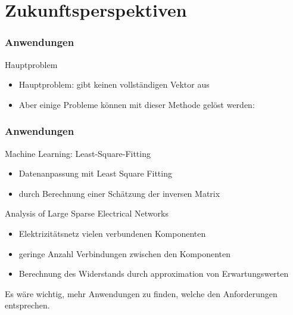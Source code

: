 \section{Zukunftsperspektiven}


\begin{frame}
    \frametitle{Anwendungen}

    Hauptproblem
    \begin{itemize}
        \item Hauptproblem: gibt keinen vollständigen Vektor aus
        \item Aber einige Probleme können mit dieser Methode gelöst werden:
    \end{itemize}
    
\end{frame}

\begin{frame}
    \frametitle{Anwendungen}

    Machine Learning: Least-Square-Fitting
    \begin{itemize}
        \item Datenanpassung mit Least Square Fitting
        \item durch Berechnung einer Schätzung der inversen Matrix
    \end{itemize}

   \hfil


    Analysis of Large Sparse Electrical Networks 
    \begin{itemize}
        \item Elektrizitätsnetz vielen verbundenen Komponenten 
        \item geringe Anzahl Verbindungen zwischen den Komponenten
        \item Berechnung des Widerstands durch approximation von Erwartungswerten
    \end{itemize} 

   \hfil
   
    Es wäre wichtig, mehr Anwendungen zu finden, welche den Anforderungen entsprechen. 
\end{frame}

